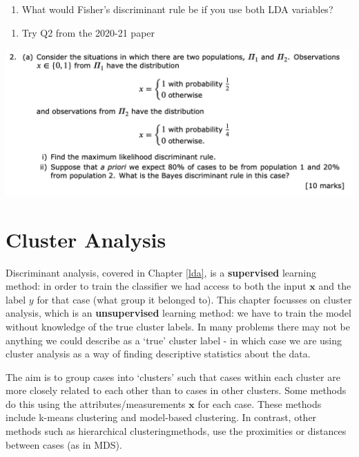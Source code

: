 \documentclass[
]{book}
\providecommand{\tightlist}{%
  \setlength{\itemsep}{0pt}\setlength{\parskip}{0pt}}
\theoremstyle{definition}
\theoremstyle{definition}
\theoremstyle{definition}
\theoremstyle{definition}
\theoremstyle{remark}
\begin{document}
\begin{enumerate}
\def\labelenumi{\roman{enumi}.}
\setcounter{enumi}{3}
\tightlist
\item
  What would Fisher's discriminant rule be if you use both LDA variables?
\end{enumerate}

\begin{enumerate}
\def\labelenumi{\arabic{enumi}.}
\setcounter{enumi}{5}
\tightlist
\item
  Try Q2 from the 2020-21 paper
\end{enumerate}

\includegraphics{figs/LDA_2020_21_Q2.png}

\hypertarget{cluster}{%
\chapter{Cluster Analysis}\label{cluster}}

Discriminant analysis, covered in Chapter \ref{lda}, is a \textbf{supervised} learning method: in order to train the classifier we had access to both the input \(\mathbf x\) and the label \(y\) for that case (what group it belonged to).
This chapter focusses on cluster analysis, which is an \textbf{unsupervised} learning method: we have to train the model without knowledge of the true cluster labels. In many problems there may not be anything we could describe as a `true' cluster label - in which case we are using cluster analysis as a way of finding descriptive statistics about the data.

The aim is to group cases into `clusters' such that cases within each cluster are more closely related to each other than to cases in other clusters. Some methods do this using the attributes/measurements \(\mathbf x\) for each case. These methods include k-means clustering and model-based clustering. In contrast, other methods such as hierarchical clusteringmethods, use the proximities or distances between cases (as in MDS).
\end{document}
